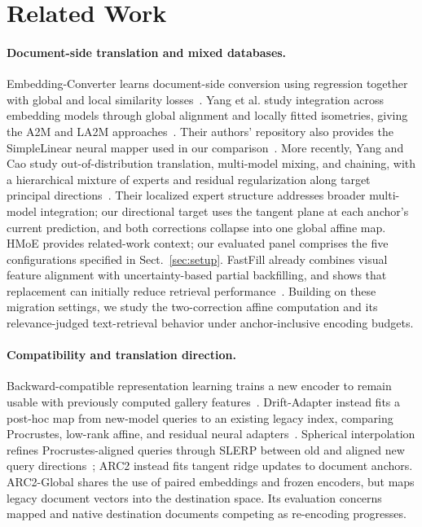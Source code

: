 \section{Related Work}
\label{sec:related}

\paragraph{Document-side translation and mixed databases.}
Embedding-Converter learns document-side conversion using regression together with global and local similarity losses~\cite{embeddingconverter}.
Yang et al. study integration across embedding models through global alignment and locally fitted isometries, giving the A2M and LA2M approaches~\cite{la2m}.
Their authors' repository also provides the SimpleLinear neural mapper used in our comparison~\cite{simplelinear}.
More recently, Yang and Cao study out-of-distribution translation, multi-model mixing, and chaining, with a hierarchical mixture of experts and residual regularization along target principal directions~\cite{yang2026translation}.
Their localized expert structure addresses broader multi-model integration; our directional target uses the tangent plane at each anchor's current prediction, and both corrections collapse into one global affine map.
HMoE provides related-work context; our evaluated panel comprises the five configurations specified in Sect.~\ref{sec:setup}.
FastFill already combines visual feature alignment with uncertainty-based partial backfilling, and shows that replacement can initially reduce retrieval performance~\cite{fastfill2023}.
Building on these migration settings, we study the two-correction affine computation and its relevance-judged text-retrieval behavior under anchor-inclusive encoding budgets.

\paragraph{Compatibility and translation direction.}
Backward-compatible representation learning trains a new encoder to remain usable with previously computed gallery features~\cite{shen2020backward}.
Drift-Adapter instead fits a post-hoc map from new-model queries to an existing legacy index, comparing Procrustes, low-rank affine, and residual neural adapters~\cite{driftadapter}.
Spherical interpolation refines Procrustes-aligned queries through SLERP between old and aligned new query directions~\cite{spherical2026}; ARC2 instead fits tangent ridge updates to document anchors.
ARC2-Global shares the use of paired embeddings and frozen encoders, but maps legacy document vectors into the destination space.
Its evaluation concerns mapped and native destination documents competing as re-encoding progresses.

